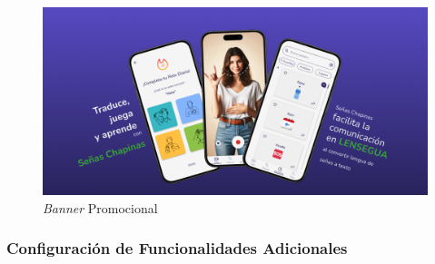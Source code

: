 \begin{itemize}
\begin{itemize}
        \begin{figure} [H]
            \centering
            \includegraphics[width=1\linewidth]{figuras/promocional_app.png}
            \caption{\textit{Banner} Promocional}
            \label{fig:enter-label}
        \end{figure}
    \end{itemize}
\end{itemize}

\subsubsection{Configuración de Funcionalidades Adicionales}

